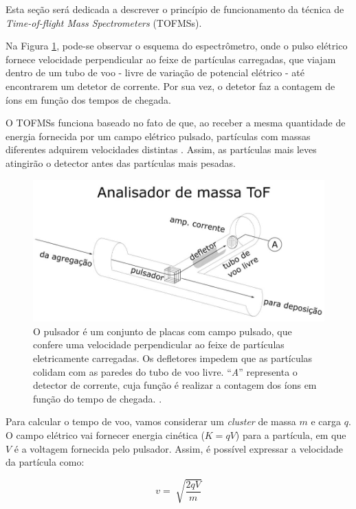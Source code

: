 Esta seção será dedicada a descrever o princípio de funcionamento da técnica de \textit{Time-of-flight Mass Spectrometers} (TOFMSs).

Na Figura \ref{fig:tof}, pode-se observar o esquema do espectrômetro, onde o pulso elétrico fornece velocidade perpendicular ao feixe de partículas carregadas, que viajam dentro de um tubo de voo - livre de variação de potencial elétrico - até encontrarem um detetor de corrente. Por sua vez, o detetor faz a contagem de íons em função dos tempos de chegada.

O TOFMSs funciona  baseado no fato de que, ao receber a mesma quantidade de energia fornecida por um campo elétrico pulsado, partículas com massas diferentes adquirem velocidades distintas \cite{dissertacao_kevin}. Assim, as partículas mais leves atingirão o detector antes das partículas mais pesadas.

\begin{figure}
  \centering
  \includegraphics[width=1\textwidth]{images/tof}
  \caption{ O pulsador é um conjunto de placas com campo pulsado, que confere uma velocidade perpendicular ao feixe de partículas eletricamente carregadas. Os defletores impedem que as partículas colidam com as paredes do tubo de voo livre. ``\textit{A}'' representa o detector de corrente, cuja função é realizar a contagem dos íons em função do tempo de chegada.  \cite{dissertacao_kevin}.  }
  \label{fig:tof}
\end{figure}

Para calcular o tempo de voo, vamos considerar um \textit{cluster} de massa $m$ e carga $q$. O campo elétrico vai fornecer energia cinética ($K = qV$) para a partícula, em que $V$ é a voltagem fornecida pelo pulsador. Assim, é possível expressar a velocidade da partícula como:

\begin{equation}
v = \sqrt[]{\frac{2qV}{m}}
\end{equation}

